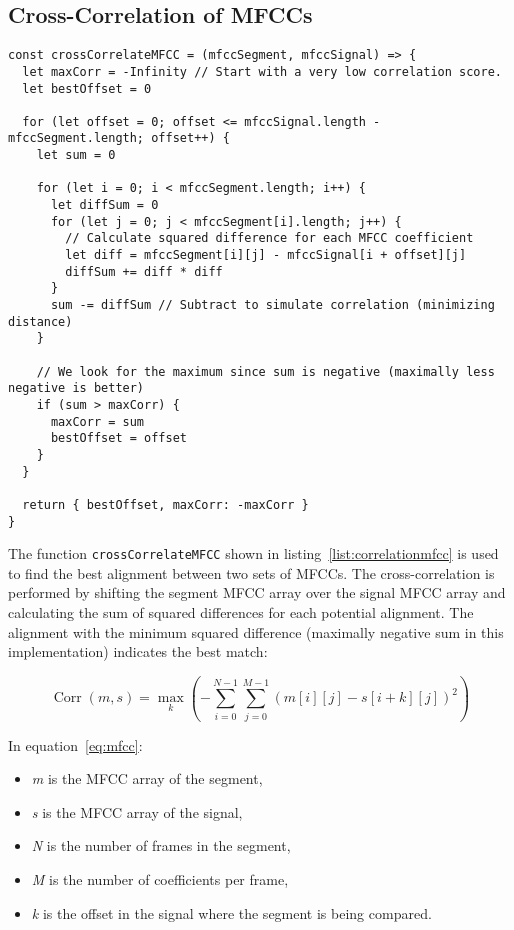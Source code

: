 \subsection{Cross-Correlation of MFCCs}

\begin{clisting}
\label{list:correlationmfcc}
\begin{verbatim}
const crossCorrelateMFCC = (mfccSegment, mfccSignal) => {
  let maxCorr = -Infinity // Start with a very low correlation score.
  let bestOffset = 0

  for (let offset = 0; offset <= mfccSignal.length - mfccSegment.length; offset++) {
    let sum = 0

    for (let i = 0; i < mfccSegment.length; i++) {
      let diffSum = 0
      for (let j = 0; j < mfccSegment[i].length; j++) {
        // Calculate squared difference for each MFCC coefficient
        let diff = mfccSegment[i][j] - mfccSignal[i + offset][j]
        diffSum += diff * diff
      }
      sum -= diffSum // Subtract to simulate correlation (minimizing distance)
    }

    // We look for the maximum since sum is negative (maximally less negative is better)
    if (sum > maxCorr) {
      maxCorr = sum
      bestOffset = offset
    }
  }

  return { bestOffset, maxCorr: -maxCorr }
}
\end{verbatim}
\end{clisting}

The function \texttt{crossCorrelateMFCC} shown in listing~\ref{list:correlationmfcc} is used to find the best alignment between two sets of MFCCs. The cross-correlation is performed by shifting the segment MFCC array over the signal MFCC array and calculating the sum of squared differences for each potential alignment. The alignment with the minimum squared difference (maximally negative sum in this implementation) indicates the best match:

\begin{equation}
\label{eq:mfcc}
\operatorname{Corr}(m, s)=\max _k\left(-\sum_{i=0}^{N-1} \sum_{j=0}^{M-1}(m[i][j]-s[i+k][j])^2\right)
\end{equation}

\noindent In equation~\ref{eq:mfcc}:
\begin{itemize}
\item \textit{m} is the MFCC array of the segment,
\item \textit{s} is the MFCC array of the signal,
\item \textit{N} is the number of frames in the segment,
\item \textit{M} is the number of coefficients per frame,
\item \textit{k} is the offset in the signal where the segment is being compared.
\end{itemize}


